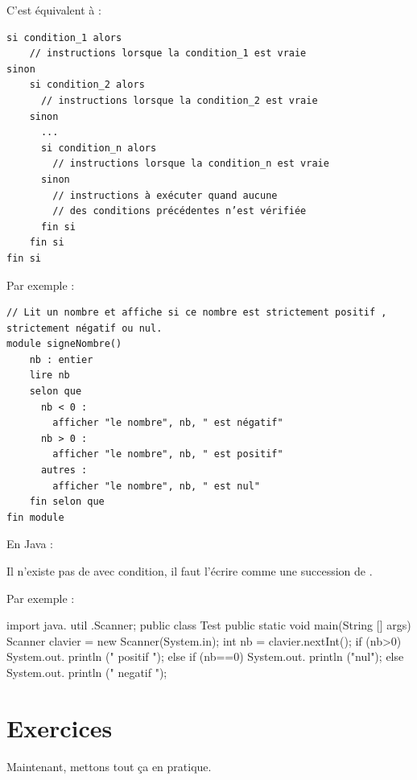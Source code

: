 \documentclass[11pt,a4paper]{article}
\begin{document}
            \par
        C'est \'equivalent \`a : 
            \par
        \begin{verbatim}
si condition_1 alors
    // instructions lorsque la condition_1 est vraie
sinon
    si condition_2 alors
      // instructions lorsque la condition_2 est vraie
    sinon
      ...
      si condition_n alors
        // instructions lorsque la condition_n est vraie
      sinon
        // instructions à exécuter quand aucune
        // des conditions précédentes n’est vérifiée
      fin si
    fin si
fin si
      \end{verbatim}Par exemple : 
            \par
        \begin{verbatim}
// Lit un nombre et affiche si ce nombre est strictement positif , strictement négatif ou nul.
module signeNombre()
    nb : entier
    lire nb
    selon que 
      nb < 0 :
        afficher "le nombre", nb, " est négatif"
      nb > 0 :
        afficher "le nombre", nb, " est positif"
      autres : 
        afficher "le nombre", nb, " est nul"
    fin selon que
fin module
    \end{verbatim}En Java :
            \par
        Il n'existe pas de \verb@switch@ avec condition, 
		  il faut l'\'ecrire comme une succession de \verb@if@.
            \par
        \begin{Java}
if (condition_1){
      // instructions lorsque la condition_1 est vraie
}else if (condition_2){
      // instructions lorsque la condition_2 est vraie
} ... 
} else if (condition_n){
      // instructions lorsque la condition_n est vraie
} else {
      // instructions a executer quand aucune
      // des conditions precedentes n est verifiee
}
      \end{Java}Par exemple : 
            \par
        \begin{Java}
import java. util .Scanner;
public class Test {
    public static void main(String [] args) {
      Scanner clavier = new Scanner(System.in);
      int nb = clavier.nextInt();
      if (nb>0) {
        System.out. println (" positif ");
      } else if (nb==0) {
        System.out. println ("nul");
      } else {
        System.out. println (" negatif ");
      }
    }
}
    \end{Java}\section{Exercices}
				Maintenant, mettons tout \c ca en pratique.
      
\end{document}
